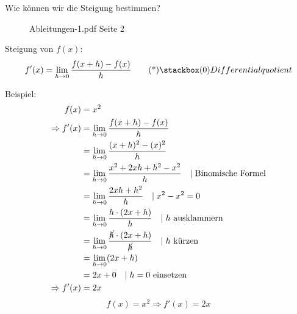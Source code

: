 Wie können wir die Steigung bestimmen?
\begin{figure}[H]
    \centering
    \label{figEmpty}
    \caption{Ableitungen-1.pdf Seite 2}
\end{figure}
Steigung von \(f(x)\):
\begin{equation}
    f'(x) = \lim_{h\to 0}\frac{f(x+h)-f(x)}{h}
    \eqname{Differentialquotient}
\end{equation}

Beispiel:
\begin{align}
    f(x) &= x^2\\
    \Rightarrow f'(x) &= \lim_{h\to 0}\frac{f(x+h)-f(x)}{h}\\
    &=\lim_{h\to 0}\frac{(x+h)^2-(x)^2}{h}\\
    &=\lim_{h\to 0}\frac{x^2+2xh + h^2 -x^2}{h} \mcomm \text{Binomische Formel}\\
    &=\lim_{h\to 0}\frac{2xh + h^2}{h} \mcomm x^2-x^2=0\\
    &=\lim_{h\to 0}\frac{h \cdot(2x + h)}{h} \mcomm h\text{ ausklammern}\\
    &=\lim_{h\to 0}\frac{\cancel{h} \cdot(2x + h)}{\cancel{h}} \mcomm h\text{ kürzen}\\
    &=\lim_{h\to 0}(2x + h)\\
    &=2x + 0 \mcomm h=0 \text{ einsetzen}\\
    \Rightarrow f'(x) &= 2x
\end{align}
\begin{equation}
    \boxed{f(x) = x^2 \Rightarrow f'(x)=2x}
\end{equation}

